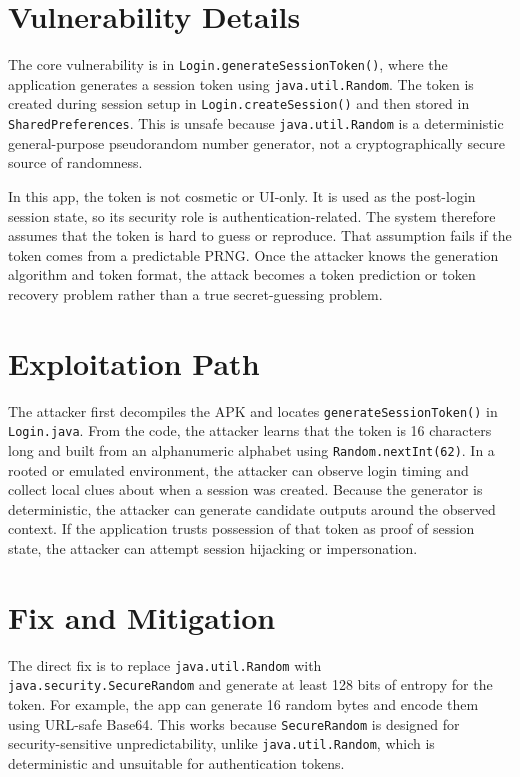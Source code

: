\documentclass[letterpaper,twocolumn,10pt]{article}
\begin{document}
\section{Vulnerability Details}
The core vulnerability is in \texttt{Login.generateSessionToken()}, where the application generates a session token using \texttt{java.util.Random}. The token is created during session setup in \texttt{Login.createSession()} and then stored in \texttt{SharedPreferences}. This is unsafe because \texttt{java.util.Random} is a deterministic general-purpose pseudorandom number generator, not a cryptographically secure source of randomness.

In this app, the token is not cosmetic or UI-only. It is used as the post-login session state, so its security role is authentication-related. The system therefore assumes that the token is hard to guess or reproduce. That assumption fails if the token comes from a predictable PRNG. Once the attacker knows the generation algorithm and token format, the attack becomes a token prediction or token recovery problem rather than a true secret-guessing problem.

\section{Exploitation Path}
The attacker first decompiles the APK and locates \texttt{generateSessionToken()} in \texttt{Login.java}. From the code, the attacker learns that the token is 16 characters long and built from an alphanumeric alphabet using \texttt{Random.nextInt(62)}. In a rooted or emulated environment, the attacker can observe login timing and collect local clues about when a session was created. Because the generator is deterministic, the attacker can generate candidate outputs around the observed context. If the application trusts possession of that token as proof of session state, the attacker can attempt session hijacking or impersonation.

\section{Fix and Mitigation}
The direct fix is to replace \texttt{java.util.Random} with \texttt{java.security.SecureRandom} and generate at least 128 bits of entropy for the token. For example, the app can generate 16 random bytes and encode them using URL-safe Base64. This works because \texttt{SecureRandom} is designed for security-sensitive unpredictability, unlike \texttt{java.util.Random}, which is deterministic and unsuitable for authentication tokens.
\end{document}
